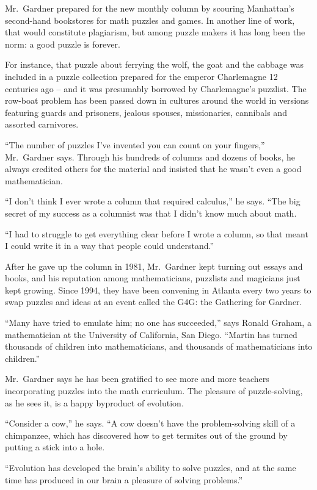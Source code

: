 ﻿\documentclass[12pt]{article}
\begin{document}
Mr.~Gardner prepared for the new monthly column by scouring Manhattan's second-hand bookstores for
math puzzles and games. In another line of work, that would constitute plagiarism, but among puzzle
makers it has long been the norm: a good puzzle is forever.

For instance, that puzzle about ferrying the wolf, the goat and the cabbage was included in a puzzle
collection prepared for the emperor Charlemagne 12 centuries ago -- and it was presumably borrowed
by Charlemagne's puzzlist. The row-boat problem has been passed down in cultures around the world in
versions featuring guards and prisoners, jealous spouses, missionaries, cannibals and assorted
carnivores.

``The number of puzzles I've invented you can count on your fingers,'' Mr.~Gardner says. Through his
hundreds of columns and dozens of books, he always credited others for the material and insisted
that he wasn't even a good mathematician.

``I don't think I ever wrote a column that required calculus,'' he says. ``The big secret of my
success as a columnist was that I didn't know much about math.

``I had to struggle to get everything clear before I wrote a column, so that meant I could write it
in a way that people could understand.''

After he gave up the column in 1981, Mr.~Gardner kept turning out essays and books, and his
reputation among mathematicians, puzzlists and magicians just kept growing. Since 1994, they have
been convening in Atlanta every two years to swap puzzles and ideas at an event called the G4G: the
Gathering for Gardner.

``Many have tried to emulate him; no one has succeeded,'' says Ronald Graham, a mathematician at the
University of California, San Diego. ``Martin has turned thousands of children into mathematicians,
and thousands of mathematicians into children.''

Mr.~Gardner says he has been gratified to see more and more teachers incorporating puzzles into the
math curriculum. The pleasure of puzzle-solving, as he sees it, is a happy byproduct of evolution.

``Consider a cow,'' he says. ``A cow doesn't have the problem-solving skill of a chimpanzee, which
has discovered how to get termites out of the ground by putting a stick into a hole.

``Evolution has developed the brain's ability to solve puzzles, and at the same time has produced in
our brain a pleasure of solving problems.''
\end{document}
